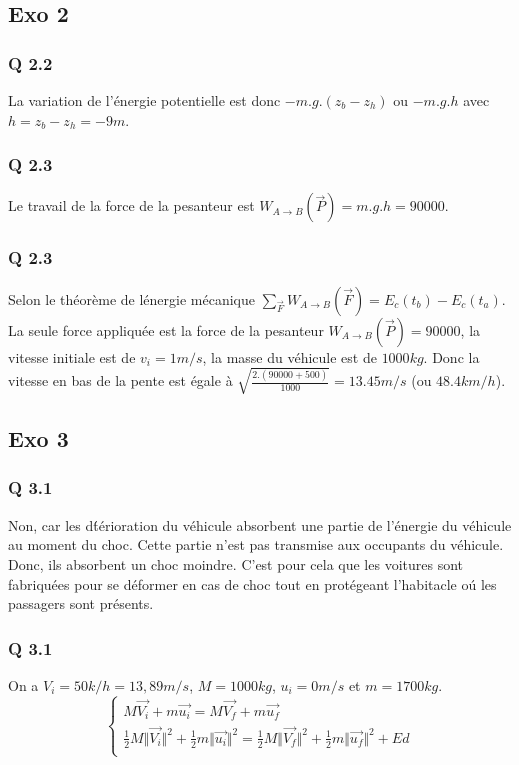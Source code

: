 \documentclass[]{book}
\theoremstyle{definition}
\begin{document}
\subsection*{Exo 2}
\subsubsection*{Q 2.2}
La variation de l'\'energie potentielle est donc $-m.g.(z_b - z_h)$ ou $-m.g.h$ avec $h = z_b - z_h = -9m$.

\subsubsection*{Q 2.3}
Le travail de la force de la pesanteur est $W_{A \to B}(\overrightarrow{P})= m.g.h = 90000$.

\subsubsection*{Q 2.3}
Selon le th\'eor\`eme de l\'energie m\'ecanique $\sum_{\overrightarrow{F}}W_{A \to B}(\overrightarrow{F}) = E_c(t_b) - E_c(t_a)$.
La seule force appliqu\'ee est la force de la pesanteur $W_{A \to B}(\overrightarrow{P})= 90000$, la vitesse initiale est de $v_i = 1m/s$, la masse du v\'ehicule est de $1000kg$. Donc la vitesse en bas de la pente est \'egale \`a $\sqrt{\frac{2.(90000+500)}{1000}} = 13.45m/s$ (ou $48.4km/h$).

\subsection*{Exo 3}
\subsubsection*{Q 3.1}
Non, car les d\'t\'erioration du v\'ehicule absorbent une partie de l'\'energie du v\'ehicule au moment du choc. Cette partie n'est pas transmise aux occupants du v\'ehicule. Donc, ils absorbent un choc moindre. C'est pour cela que les voitures sont fabriqu\'ees pour se d\'eformer en cas de choc tout en prot\'egeant l'habitacle o\'u les passagers sont pr\'esents.

\subsubsection*{Q 3.1}
On a $V_i = 50 k/h = 13,89 m/s$, $M=1000 kg$, $u_i = 0m/s$ et $m=1700kg$.
$$
\left\{ 
\begin{array}{l}
 M\overrightarrow{V_i} + m\overrightarrow{u_i} = M\overrightarrow{V_f} + m\overrightarrow{u_f} \\
 \frac{1}{2}M\Vert \overrightarrow{V_i} \Vert^2 + \frac{1}{2}m\Vert \overrightarrow{u_i} \Vert^2 = \frac{1}{2}M\Vert \overrightarrow{V_f} \Vert^2 + \frac{1}{2}m\Vert \overrightarrow{u_f} \Vert^2 + Ed\\
\end{array}
\right. 
$$
\end{document}
